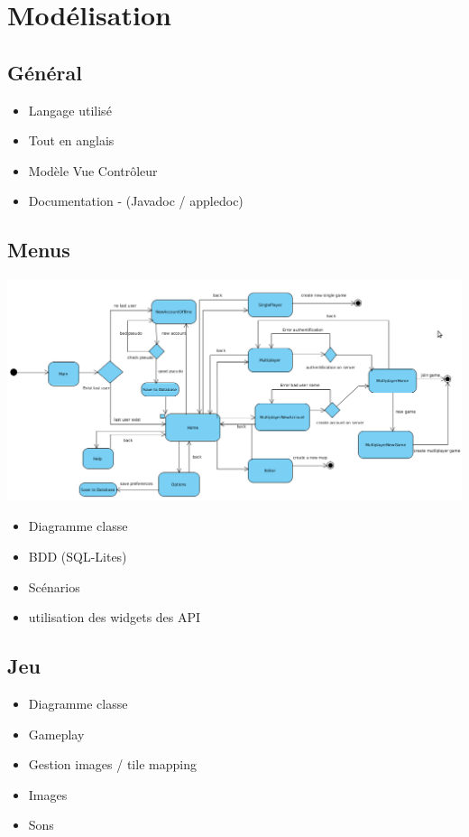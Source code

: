 \documentclass[]{report}
\begin{document}
	\section{Modélisation}
		\subsection{Général}
			\begin{itemize}
				\item{Langage utilisé}
				\item{Tout en anglais}
				\item{Modèle Vue Contrôleur}
				\item{Documentation - (Javadoc / appledoc)}
			\end{itemize}
			
		\subsection{Menus}
		\begin{center}
			\includegraphics[width=16cm]{./ressources/diag_activity.png}
		\end{center}
		
			\begin{itemize}
				\item{Diagramme classe}
				\item{BDD (SQL-Lites)}\\
				
				
				\item{Scénarios}
				\item{utilisation des widgets des API}
			\end{itemize}
			
		\subsection{Jeu}
			\begin{itemize}
				\item{Diagramme classe}
				\item{Gameplay}
				\item{Gestion images / tile mapping}
				\item{Images}
				\item{Sons}
			\end{itemize}
			
\end{document}

